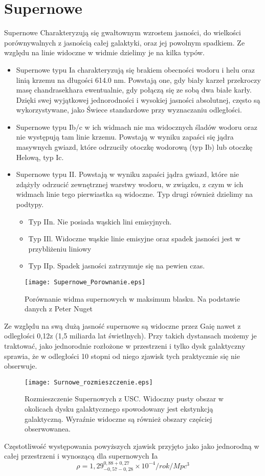 \documentclass[polish,12pt]{pracamgr}
\begin{document}
\section {Supernowe}
Supernowe Charakteryzują się gwałtownym wzrostem jasności, do wielkości porównywalnych z jasnością całej galaktyki, oraz jej powolnym spadkiem. Ze względu na linie widoczne w widmie dzielimy je na kilka typów.
\begin{itemize}
\item	Supernowe typu Ia charakteryzują się brakiem obecności wodoru i helu oraz linią krzemu na długości 614.0 nm. Powstają one, gdy biały karzeł przekroczy masę chandrasekhara ewentualnie, gdy połączą się ze sobą dwa białe karły.  Dzięki swej wyjątkowej jednorodności i wysokiej jasności absolutnej, często są wykorzystywane, jako Świece standardowe przy wyznaczaniu odległości.
\item  Supernowe typu Ib/c w ich widmach nie ma widocznych śladów wodoru oraz nie występują tam linie krzemu. Powstają w wyniku zapaści się jądra masywnych gwiazd, które odrzuciły otoczkę wodorową (typ Ib) lub otoczkę Helową, typ Ic.
\item  Supernowe typu II. Powstają w wyniku zapaści jądra gwiazd, które nie zdążyły odrzucić zewnętrznej warstwy wodoru, w związku, z czym w ich widmach linie tego pierwiastka są widoczne. Typ drugi również dzielimy na podtypy.
\begin{itemize}
\item Typ IIn. Nie posiada wąskich lini emisyjnych. 
\item Typ IIl. Widoczne wąskie linie emisyjne oraz spadek jasności jest w  przybliżeniu liniowy
\item Typ IIp. Spadek jasności zatrzymuje się na pewien czas.
\end{itemize}
\end{itemize}
\begin{figure}[h]
\centering
\texttt{[image: Supernowe\_Porownanie.eps]}
\caption{Porównanie widma supernowych w maksimum blasku. Na podstawie danych z Peter Nuget}
\label{Rys 3}
\end{figure}
 Ze względu na swą dużą jasność supernowe są widoczne przez Gaię nawet z odległości 0,12z (1,5 miliarda lat świetlnych). Przy takich dystansach możemy je traktować, jako jednorodnie rozłożone w przestrzeni i tylko dysk galaktyczny sprawia, że w odległości 10 stopni od niego zjawisk tych praktycznie się nie obserwuje. 
\begin{figure}[h]
\centering
\texttt{[image: Surnowe\_rozmieszczenie.eps]}
\caption{ Rozmieszczenie Supernowych z USC. Widoczny pusty obszar w okolicach dysku galaktycznego spowodowany jest ekstynkcją galaktyczną. Wyraźnie widoczne są również obszary częściej obserwowanea.}
\label{Mapa Supernowych}
\end{figure}
Częstotliwość występowania powyższych zjawisk przyjęto jako jako jednorodną w całej przestrzeni i wynoszącą dla supernowych Ia
	\begin{equation}
	\rho = 1,29^{0,88+0,27}_{-0,57-0,28} \times 10^{-4} / rok / Mpc^3 
	\end{equation}
\end{document}
